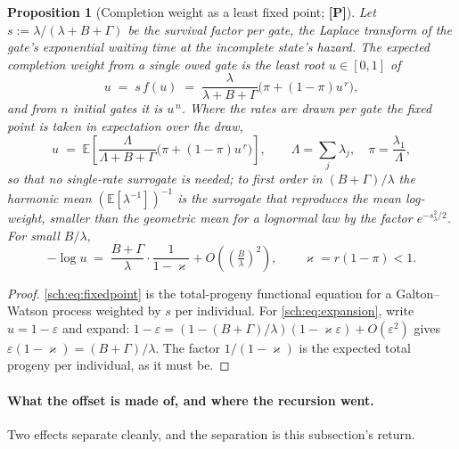 \documentclass[11pt]{article}
\newcommand{\E}{\mathbb{E}}
\theoremstyle{plain}
\newtheorem{proposition}[theorem]{Proposition}
\theoremstyle{definition}
\theoremstyle{remark}
\begin{document}
\begin{proposition}[Completion weight as a least fixed point;
\textbf{[P]}]\label{sch:prop:fixedpoint}
Let $s:=\lambda/(\lambda+B+\Gamma)$ be the survival factor per gate, the
Laplace transform of the gate's exponential waiting time at the
incomplete state's hazard. The expected completion weight from a single
owed gate is the least root $u\in[0,1]$ of
\begin{equation}\label{sch:eq:fixedpoint}
u\;=\;s\,f(u)\;=\;\frac{\lambda}{\lambda+B+\Gamma}\bigl(\pi+(1-\pi)u^{\,r}\bigr),
\end{equation}
and from $n$ initial gates it is $u^{\,n}$. Where the rates are drawn
per gate the fixed point is taken in expectation over the draw,
\begin{equation}\label{sch:eq:fixedpointrandom}
u\;=\;\E\!\left[\frac{\Lambda}{\Lambda+B+\Gamma}\bigl(\pi+(1-\pi)u^{\,r}\bigr)\right],
\qquad\Lambda=\sum_j\lambda_j,\quad\pi=\frac{\lambda_1}{\Lambda},
\end{equation}
so that no single-rate surrogate is needed; to first order in
$(B+\Gamma)/\lambda$ the harmonic mean $(\E[\lambda^{-1}])^{-1}$ is the
surrogate that reproduces the mean log-weight, smaller than the
geometric mean for a lognormal law by the factor $e^{-s_\lambda^2/2}$. For small $B/\lambda$,
\begin{equation}\label{sch:eq:expansion}
-\log u\;=\;\frac{B+\Gamma}{\lambda}\cdot\frac{1}{1-\varkappa}
+O\!\left(\left(\tfrac{B}{\lambda}\right)^{2}\right),
\qquad \varkappa=r(1-\pi)<1 .
\end{equation}
\end{proposition}

\begin{proof}
\eqref{sch:eq:fixedpoint} is the total-progeny functional equation for a
Galton--Watson process weighted by $s$ per individual. For
\eqref{sch:eq:expansion}, write $u=1-\varepsilon$ and expand:
$1-\varepsilon=(1-(B+\Gamma)/\lambda)(1-\varkappa\varepsilon)+O(\varepsilon^{2})$
gives $\varepsilon(1-\varkappa)=(B+\Gamma)/\lambda$. The factor $1/(1-\varkappa)$ is the expected total
progeny per individual, as it must be.
\end{proof}

\paragraph{What the offset is made of, and where the recursion
went.}\label{sch:rem:cefff}
Two effects separate cleanly, and the separation is this subsection's
return.
\end{document}
